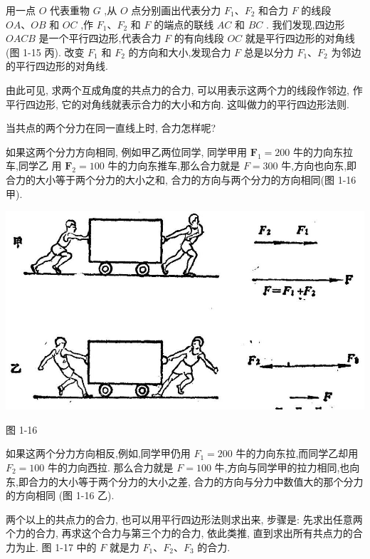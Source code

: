 \documentclass[10pt]{article}
\begin{document}
用一点 \(O\) 代表重物 \(G\) ,从 \(O\) 点分别画出代表分力 \({F}_{1}\text{、}{F}_{2}\) 和合力 \(F\) 的线段 \({OA}\text{、}{OB}\) 和 \({OC}\) ,作 \({F}_{1}\text{、}{F}_{2}\) 和 \(F\) 的端点的联线 \({AC}\) 和 \({BC}\) . 我们发现,四边形 \({OACB}\) 是一个平行四边形,代表合力 \(F\) 的有向线段 \({OC}\) 就是平行四边形的对角线 (图 1-15 丙). 改变 \({F}_{1}\) 和 \({F}_{2}\) 的方向和大小,发现合力 \(F\) 总是以分力 \({F}_{1}\text{、}{F}_{2}\) 为邻边的平行四边形的对角线.

由此可见, 求两个互成角度的共点力的合力, 可以用表示这两个力的线段作邻边, 作平行四边形, 它的对角线就表示合力的大小和方向. 这叫做力的平行四边形法则.

当共点的两个分力在同一直线上时, 合力怎样呢?

如果这两个分力方向相同, 例如甲乙两位同学, 同学甲用 \({\mathbf{F}}_{1} = {200}\) 牛的力向东拉车,同学乙 用 \({\mathbf{F}}_{2} = {100}\) 牛的力向东推车,那么合力就是 \(F = {300}\) 牛,方向也向东,即合力的大小等于两个分力的大小之和, 合力的方向与两个分力的方向相同(图 1-16 甲).

\begin{center}
\includegraphics[max width=1.0\textwidth]{images/01912d55-147c-70aa-b0e0-1782a122f948_30_993254.jpg}
\end{center}

图 1-16

如果这两个分力方向相反,例如,同学甲仍用 \({F}_{1} = {200}\) 牛的力向东拉,而同学乙却用 \({F}_{2} = {100}\) 牛的力向西拉. 那么合力就是 \(F = {100}\) 牛,方向与同学甲的拉力相同,也向东,即合力的大小等于两个分力的大小之差, 合力的方向与分力中数值大的那个分力的方向相同 (图 1-16 乙).

两个以上的共点力的合力, 也可以用平行四边形法则求出来, 步骤是: 先求出任意两个力的合力, 再求这个合力与第三个力的合力, 依此类推, 直到求出所有共点力的合力为止. 图 1-17 中的 \(F\) 就是力 \({F}_{1}\text{、}{F}_{2}\text{、}{F}_{3}\) 的合力.
\end{document}

